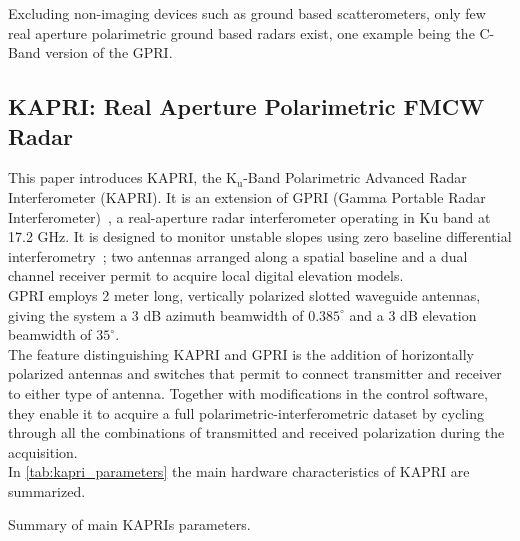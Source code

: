 Excluding non-imaging devices such as ground based scatterometers, only few real aperture polarimetric ground based radars exist, one example being the C-Band version of the GPRI\cite{Cherukumilli2012}.
\subsection{KAPRI: Real Aperture Polarimetric FMCW Radar}
This paper introduces KAPRI, the $\mathrm{K_u}$-Band Polarimetric Advanced Radar Interferometer (KAPRI)\cite{Baffelli2016a}. It is an extension of GPRI (Gamma Portable Radar Interferometer)~\cite{werner_gpri_2012,Strozzi2011, Werner2008}, a real-aperture radar interferometer operating in Ku band at 17.2 GHz. It is designed 
to monitor unstable slopes using zero baseline differential interferometry~\cite{Massonnet1993}; two antennas arranged along a spatial baseline and a dual channel receiver permit to acquire local digital elevation models.\\
GPRI employs  2 meter long, vertically polarized slotted waveguide antennas, giving the system a 3 dB azimuth beamwidth of $0.385^\circ$ and a 3 dB elevation beamwidth of $35^\circ$.\\
The feature distinguishing KAPRI and GPRI is the addition of horizontally polarized antennas and switches that permit to connect transmitter and receiver to either type of antenna. Together with modifications in the control software, they enable it to acquire a full polarimetric-interferometric dataset by cycling through all the combinations of transmitted and received polarization during the acquisition.\\  In \autoref{tab:kapri_parameters} the main hardware characteristics of KAPRI are summarized.
\begin{table*}
	\centering
	\caption{Summary of main KAPRIs parameters.}
	\label{tab:kapri_parameters}
\end{table*}
